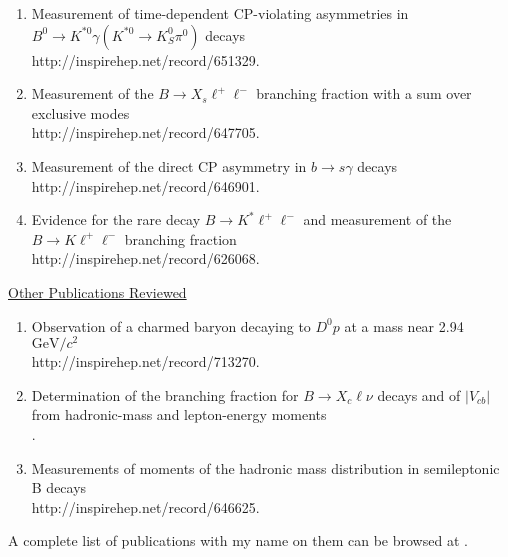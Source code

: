 \documentclass [12pt]{report}
\begin{document}
\begin{enumerate}
\item Measurement of time-dependent CP-violating asymmetries
in $B^{0}\rightarrow K^{*0}\gamma (K^{*0}\rightarrow K_{S}^{0} \pi^0)$ decays\\
{http://inspirehep.net/record/651329}.

\item Measurement of the $B\rightarrow X_{s}\ell^+\ell^-$ branching fraction with a sum over exclusive modes\\
{http://inspirehep.net/record/647705}.

\item Measurement of the direct CP asymmetry in 
$b \rightarrow s \gamma$ decays\\
{http://inspirehep.net/record/646901}.

\item Evidence for the rare decay $B\rightarrow K^{*} \ell^+\ell^-$ and measurement of the $B\rightarrow K\ell^+\ell^-$ branching fraction\\
{http://inspirehep.net/record/626068}.

\end{enumerate}

\noindent\underline{Other Publications Reviewed}
\begin{enumerate}

\item Observation of a charmed baryon decaying to $D^0 p$ at a mass near 2.94 $\textrm{GeV}/c^{\textrm{2}}$\\
{http://inspirehep.net/record/713270}.

\item Determination of the branching fraction for $B\rightarrow X_{c}\ell\nu$ decays and of $|V_{cb}|$ from hadronic-mass and lepton-energy moments\\
.

\item Measurements of moments of the hadronic mass distribution in semileptonic B decays\\
{http://inspirehep.net/record/646625}.

\end{enumerate}

A complete list of publications with my name on them can be browsed at
.
\end{document}
